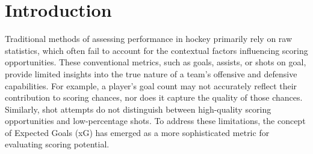 \section{Introduction}

\par Traditional methods of assessing performance in hockey primarily rely on raw statistics, which often fail to account for the contextual factors influencing scoring opportunities.
These conventional metrics, such as goals, assists, or shots on goal, provide limited insights into the true nature of a team's offensive and defensive capabilities. For example, a player’s goal count may not accurately reflect their contribution to scoring chances, nor does it capture the quality of those chances. Similarly, shot attempts do not distinguish between high-quality scoring opportunities and low-percentage shots.
To address these limitations, the concept of Expected Goals (xG) has emerged as a more sophisticated metric for evaluating scoring potential.
